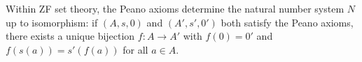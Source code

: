 Within ZF set theory, the Peano axioms determine the natural number system $N$ up to isomorphism: if $(A, s, 0)$ and $(A', s', 0')$ both satisfy the Peano axioms, there exists a unique bijection $f: A \to A'$ with $f(0) = 0'$ and $f(s(a)) = s'(f(a))$ for all $a \in A$.
